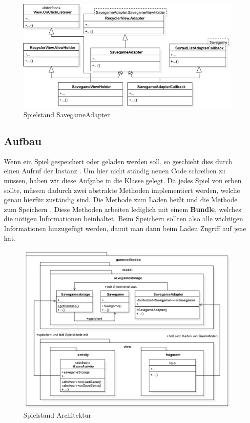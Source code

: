 \begin{figure}[h]
	\centering
	\includegraphics[width=1.0\textwidth]{resources/savegamestorage/SavegameAdapter}
	\caption{Spielstand SavegameAdapter}
\end{figure}

\subsection{Aufbau}

Wenn ein Spiel gespeichert oder geladen werden soll, so geschieht dies durch
einen Aufruf der Instanz . Um hier nicht ständig neuen
Code schreiben zu müssen, haben wir diese Aufgabe in die Klasse
 gelegt. Da jedes Spiel von  erben sollte,
müssen dadurch zwei abstrakte Methoden implementiert werden, welche genau
hierfür zuständig sind. Die Methode zum Laden heißt  und die
Methode zum Speichern . Diese Methoden arbeiten lediglich mit
einem \textbf{Bundle}, welches die nötigen Informationen beinhaltet. Beim
Speichern sollten also alle wichtigen Informationen hinzugefügt werden, damit
man dann beim Laden Zugriff auf jene hat.

\begin{figure}[h]
	\centering
	\includegraphics[width=1.0\textwidth]{resources/savegamestorage/Savegamestorage}
	\caption{Spielstand Architektur}
\end{figure}